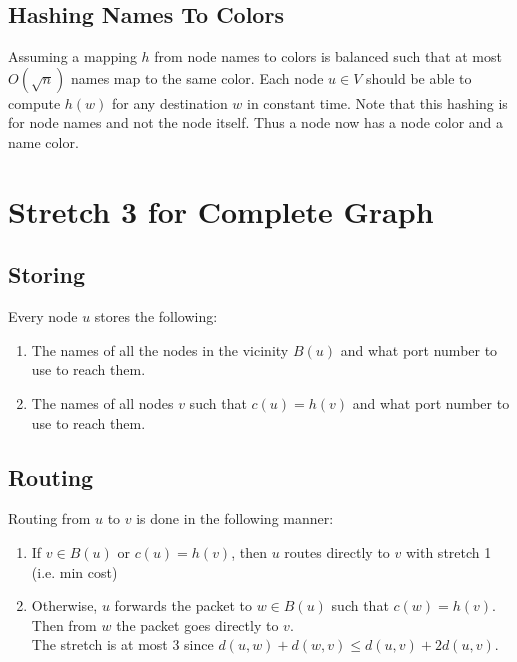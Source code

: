 

\subsection{Hashing Names To Colors}
Assuming a mapping $h$ from node names to colors is balanced such that at most
$O(\sqrt{n})$ names map to the same color. Each node $u\in V$ should be able
to compute $h(w)$ for any destination $w$ in constant time. Note that this
hashing is for node names and not the node itself. Thus a node now has a node
color and a name color.

\section{Stretch 3 for Complete Graph}
\subsection{Storing}
Every node $u$ stores the following:
\begin{enumerate}
    \item The names of all the nodes in the vicinity $B(u)$ and what port number to use to reach them.
    \item The names of all nodes $v$ such that $c(u)=h(v)$ and what port number to use to reach them.
\end{enumerate}

\subsection{Routing}
Routing from $u$ to $v$ is done in the following manner:
\begin{enumerate}
    \item If $v\in B(u)$ or $c(u)=h(v)$, then $u$ routes directly to $v$ with stretch 1 (i.e. min cost)
    \item Otherwise, $u$ forwards the packet to $w\in B(u)$ such that $c(w)=h(v)$. Then from $w$ the packet goes directly to $v$.\\
        The stretch is at most $3$ since $d(u,w) + d(w,v) \leq d(u,v)+2d(u,v)$.
\end{enumerate}

